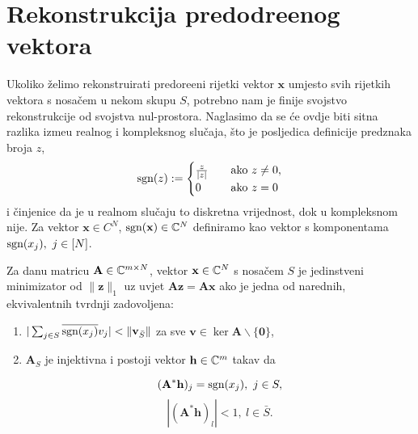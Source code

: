 \documentclass[a4paper,twoside,12pt]{memoir} %
\newcommand{\vect}[1]{\mathbf{#1}}
\renewcommand{\vec}{\vect}
\newcommand{\norm}[1]{\|{#1}\|}
\newcommand{\sgn}{\text{\normalfont{sgn}}}
\begin{document}
\section[Rekonstrukcija predodre\dj enog vektora][Rekonstrukcija predodre\dj enog vektora]{Rekonstrukcija predodre\dj enog vektora}
Ukoliko \v{z}elimo rekonstruirati predore\dj eni rijetki vektor $\vec x$ umjesto svih rijetkih vektora s nosa\v{c}em u nekom skupu $S$, potrebno nam je finije svojstvo rekonstrukcije od svojstva nul-prostora. Naglasimo da se \'ce ovdje biti sitna razlika izme\dj u realnog i kompleksnog slu\v{c}aja, \v{s}to je posljedica definicije predznaka broja $z$,
\begin{equation*}
    \sgn(z):= 
    \begin{cases}
        \frac{z}{|z|} \quad &\text{ako } z \neq 0,\\
        0 &\text{ako } z = 0
    \end{cases}
\end{equation*}
i \v{c}injenice da je u realnom slu\v{c}aju to diskretna vrijednost, dok u kompleksnom nije. Za vektor $\vec x \in C^N$, $\sgn(\vec x)\in \C^N$ definiramo kao vektor s komponentama $\sgn(x_j),\ j \in [N]$.
\begin{thm}
    Za danu matricu $\vec A \in \C^{m \times N}$, vektor $\vec x \in \C^N$ s nosa\v{c}em $S$ je jedinstveni minimizator od $\norm{\vec z}_1$ uz uvjet $\vec{Az} = \vec{Ax}$ ako je jedna od narednih, ekvivalentnih tvrdnji zadovoljena:
    \begin{enumerate}[label=(\alph*)]
        \item $|\sum_{j \in S} \overline{\sgn(x_j)}v_j| < \norm{\vec v_{\bar S}}$ za sve $\vec v \in \ker \vec A \backslash \{ \vec 0 \}$, 
            \newpage
        \item $\vec A_S$ je injektivna i postoji vektor $\vec h \in \C^m$ takav da
            \begin{multicols}{2}
                \noindent
                \begin{equation*}
                    (\vec A^* \vec h)_j = \sgn(x_j),\ j \in S,
                \end{equation*}
                \begin{equation*}
                    |(\vec A^* \vec h)_l| < 1,\ l \in \bar S.
                \end{equation*}
            \end{multicols}
    \end{enumerate}
\end{thm}
\end{document}
